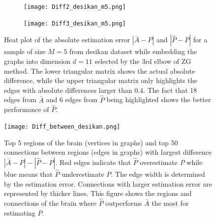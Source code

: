 \documentclass[a4paper]{article}
\begin{document}
\begin{figure}
\centering
\begin{subfigure}{.5\textwidth}
  \centering
  \texttt{[image: Diff2\_desikan\_m5.png]}
\end{subfigure}%
\begin{subfigure}{.5\textwidth}
  \centering
  \texttt{[image: Diff3\_desikan\_m5.png]}
\end{subfigure}
\caption{Heat plot of the absolute estimation error $|\bar{A} - P|$ and $|\hat{P} - P|$ for a sample of size $M=5$ from desikan dataset while embedding the graphs into dimension $d=11$ selected by the 3rd elbow of ZG method. The lower triangular matrix shows the actual absolute difference, while the upper triangular matrix only highlights the edges with absolute differences larger than $0.4$. The fact that 18 edges from $\bar{A}$ and 6 edges from $\hat{P}$ being highlighted shows the better performance of $\hat{P}$.}
\label{fig:Diff_desikan_m5}
\end{figure}

\begin{figure}[!htb]
\centering
\texttt{[image: Diff\_between\_desikan.png]}
\caption{Top 5 regions of the brain (vertices in graphs) and top 50 connections between regions (edges in graphs) with largest difference $|\bar{A} - P| - |\hat{P} - P|$. Red edges indicate that $\hat{P}$ overestimate $P$ while blue means that $\hat{P}$ underestimate $P$. The edge width is determined by the estimation error. Connections with larger estimation error are represented by thicker lines. This figure shows the regions and connections of the brain where $\hat{P}$ outperforms $\bar{A}$ the most for estimating $P$.}
\label{fig:Diff_between_desikan}
\end{figure}
\end{document}
